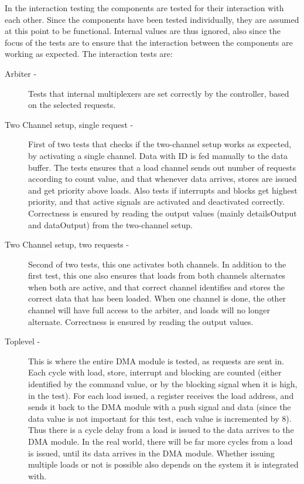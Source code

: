 \begin{appendix}
In the interaction testing the components are tested for their interaction with each other.
Since the components have been tested individually, they are assumed at this point to be functional. 
Internal values are thus ignored, also since the focus of the tests are to ensure that the interaction between the components are working as expected.
The interaction tests are:
\begin{description}
    \item[Arbiter -]
    Tests that internal multiplexers are set correctly by the controller, based on the selected requests.
    \item[Two Channel setup, single request -]
    First of two tests that checks if the two-channel setup works as expected, by activating a single channel.
    Data with ID is fed manually to the data buffer.
    The tests ensures that a load channel sends out number of requests according to count value, and that whenever data arrives, stores are issued and get priority above loads.
    Also tests if interrupts and blocks get highest priority, and that active signals are activated and deactivated correctly.
    Correctness is ensured by reading the output values (mainly detailsOutput and dataOutput) from the two-channel setup.
    \item[Two Channel setup, two requests -]
    Second of two tests, this one activates both channels.
    In addition to the first test, this one also ensures that loads from both channels alternates when both are active, and that correct channel identifies and stores the correct data that has been loaded.
    When one channel is done, the other channel will have full access to the arbiter, and loads will no longer alternate.
    Correctness is ensured by reading the output values.
    \item[Toplevel -]
    This is where the entire DMA module is tested, as requests are sent in.
    Each cycle with load, store, interrupt and blocking are counted (either identified by the command value, or by the blocking signal when it is high, in the test).
    For each load issued, a register receives the load address, and sends it back to the DMA module with a push signal and data (since the data value is not important for this test, each value is incremented by 8).
    Thus there is a cycle delay from a load is issued to the data arrives to the DMA module.
    In the real world, there will be far more cycles from a load is issued, until its data arrives in the DMA module.
    Whether issuing multiple loads or not is possible also depends on the system it is integrated with.

\end{description}
\end{appendix}

